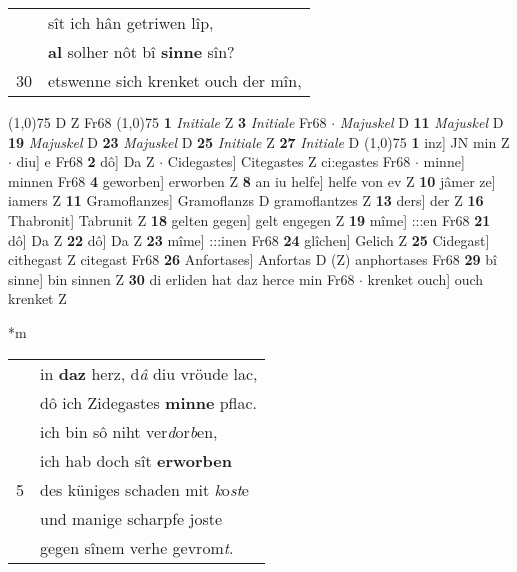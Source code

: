 \documentclass[8pt,a4paper,notitlepage]{article}
\begin{document}
\begin{table}[ht]
\begin{minipage}[t]{0.5\linewidth}
\begin{tabular}{rl}
 & sît ich hân getriwen lîp,\\ 
 & \textbf{al} solher nôt bî \textbf{sinne} sîn?\\ 
30 & etswenne sich krenket ouch der mîn,\\ 
\end{tabular}
\scriptsize
\line(1,0){75} \newline
D Z Fr68 \newline
\line(1,0){75} \newline
\textbf{1} \textit{Initiale} Z  \textbf{3} \textit{Initiale} Fr68   $\cdot$ \textit{Majuskel} D  \textbf{11} \textit{Majuskel} D  \textbf{19} \textit{Majuskel} D  \textbf{23} \textit{Majuskel} D  \textbf{25} \textit{Initiale} Z  \textbf{27} \textit{Initiale} D  \newline
\line(1,0){75} \newline
\textbf{1} inz] JN min Z  $\cdot$ diu] e Fr68 \textbf{2} dô] Da Z  $\cdot$ Cidegastes] Citegastes Z ci:egastes Fr68  $\cdot$ minne] minnen Fr68 \textbf{4} geworben] erworben Z \textbf{8} an iu helfe] helfe von ev Z \textbf{10} jâmer ze] iamers Z \textbf{11} Gramoflanzes] Gramoflanzs D gramoflantzes Z \textbf{13} ders] der Z \textbf{16} Thabronit] Tabrunit Z \textbf{18} gelten gegen] gelt engegen Z \textbf{19} mîme] :::en Fr68 \textbf{21} dô] Da Z \textbf{22} dô] Da Z \textbf{23} mîme] :::inen Fr68 \textbf{24} glîchen] Gelich Z \textbf{25} Cidegast] cithegast Z citegast Fr68 \textbf{26} Anfortases] Anfortas D (Z) anphortases Fr68 \textbf{29} bî sinne] bin sinnen Z \textbf{30} di erliden hat daz herce min Fr68  $\cdot$ krenket ouch] ouch krenket Z \newline
\end{minipage}
\hspace{0.5cm}
\begin{minipage}[t]{0.5\linewidth}
\small
\begin{center}*m
\end{center}
\begin{tabular}{rl}
 & in \textbf{daz} herz, d\textit{â} diu vröude lac,\\ 
 & dô ich Zidegastes \textbf{minne} pflac.\\ 
 & ich bin sô niht ver\textit{d}or\textit{b}en,\\ 
 & ich hab doch sît \textbf{erworben}\\ 
5 & des küniges schaden mit \textit{k}o\textit{st}e\\ 
 & und manige scharpfe joste\\ 
 & gegen sînem verhe gevrom\textit{t}.\\ 

\end{tabular}
\end{minipage}
\end{table}
\end{document}
